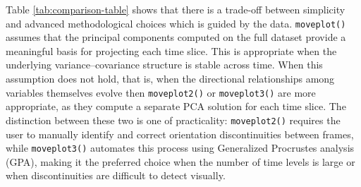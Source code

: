 \begin{table}[!h]
\centering
\caption{\label{tab:comparison-table}Comparison of moveplot(), moveplot2(), and moveplot3().}
\centering
{}
\end{table}

Table \ref{tab:comparison-table} shows that there is a trade-off between simplicity and advanced methodological choices which is guided by the data. \texttt{moveplot()} assumes that the principal components computed on the full dataset provide a meaningful basis for projecting each time slice. This is appropriate when the underlying variance--covariance structure is stable across time. When this assumption does not hold, that is, when the directional relationships among variables themselves evolve then \texttt{moveplot2()} or \texttt{moveplot3()} are more appropriate, as they compute a separate PCA solution for each time slice. The distinction between these two is one of practicality: \texttt{moveplot2()} requires the user to manually identify and correct orientation discontinuities between frames, while \texttt{moveplot3()} automates this process using Generalized Procrustes analysis (GPA), making it the preferred choice when the number of time levels is large or when discontinuities are difficult to detect visually.

